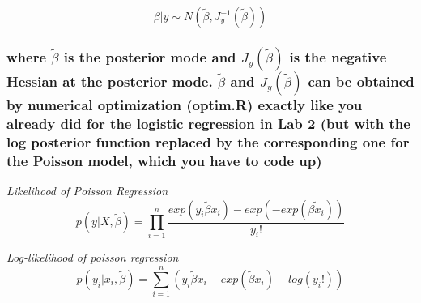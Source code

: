 \documentclass[]{article}
\begin{document}
\[ \beta|y \sim N( \widetilde{\beta}, J^{-1}_y (\tilde{\beta})) \]

\hypertarget{where-tildebeta-is-the-posterior-mode-and-j_ytildebeta-is-the-negative-hessian-at-the-posterior-mode.-tildebeta-and-j_ytildebeta-can-be-obtained-by-numerical-optimization-optim.r-exactly-like-you-already-did-for-the-logistic-regression-in-lab-2-but-with-the-log-posterior-function-replaced-by-the-corresponding-one-for-the-poisson-model-which-you-have-to-code-up}{%
\subsubsection{\texorpdfstring{where \(\tilde{\beta}\) is the posterior
mode and \(J_y(\tilde{\beta})\) is the negative Hessian at the posterior
mode. \(\tilde{\beta}\) and \(J_y(\tilde{\beta})\) can be obtained by
numerical optimization (optim.R) exactly like you already did for the
logistic regression in Lab 2 (but with the log posterior function
replaced by the corresponding one for the Poisson model, which you have
to code
up)}{where \textbackslash tilde\{\textbackslash beta\} is the posterior mode and J\_y(\textbackslash tilde\{\textbackslash beta\}) is the negative Hessian at the posterior mode. \textbackslash tilde\{\textbackslash beta\} and J\_y(\textbackslash tilde\{\textbackslash beta\}) can be obtained by numerical optimization (optim.R) exactly like you already did for the logistic regression in Lab 2 (but with the log posterior function replaced by the corresponding one for the Poisson model, which you have to code up)}}\label{where-tildebeta-is-the-posterior-mode-and-j_ytildebeta-is-the-negative-hessian-at-the-posterior-mode.-tildebeta-and-j_ytildebeta-can-be-obtained-by-numerical-optimization-optim.r-exactly-like-you-already-did-for-the-logistic-regression-in-lab-2-but-with-the-log-posterior-function-replaced-by-the-corresponding-one-for-the-poisson-model-which-you-have-to-code-up}}

\emph{Likelihood of Poisson Regression}
\[p(y|X,\tilde{\beta}) = \prod^n_{i=1} \frac{exp(y_i \tilde{\beta}x_i)-exp(-exp(\tilde{\beta x_i}))}{y_i!}\]

\emph{Log-likelihood of poisson regression}
\[p(y_i|x_i,\tilde{\beta}) = \sum^n_{i=1}(y_i\tilde{\beta}x_i -exp(\tilde{\beta}x_i)-log(y_i!)) \]
\end{document}
